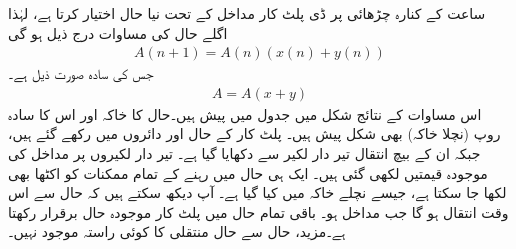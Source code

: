  ساعت کے کنارہ چڑھائی پر ڈی پلٹ کار مداخل کے تحت نیا حال اختیار کرتا ہے، لہٰذا اگلے حال کی مساوات درج ذیل ہو گی
\begin{align*}
A(n+1)=A(n)(x(n)+y(n))
\end{align*}
جس کی سادہ صورت ذیل ہے۔
\begin{align*}
A=A(x+y)
\end{align*}
اس مساوات کے نتائج شکل  میں جدول میں پیش ہیں۔حال کا خاکہ اور اس کا سادہ روپ (نچلا خاکہ) بھی شکل پیش ہیں۔ پلٹ کار کے حال  اور  دائروں میں رکھے گئے ہیں، جبکہ ان کے بیچ انتقال تیر دار لکیر سے دکھایا گیا ہے۔ تیر دار لکیروں پر مداخل  کی موجودہ قیمتیں لکھی گئی ہیں۔ ایک ہی حال میں رہنے کے تمام ممکنات کو اکٹھا بھی لکھا جا سکتا ہے، جیسے نچلے خاکہ میں کیا گیا ہے۔ آپ دیکھ سکتے ہیں کہ حال  سے  اس وقت انتقال ہو گا جب مداخل  ہو۔ باقی تمام حال میں پلٹ کار موجودہ حال برقرار رکھتا ہے۔مزید، حال  سے حال  منتقلی کا کوئی راستہ موجود نہیں۔

